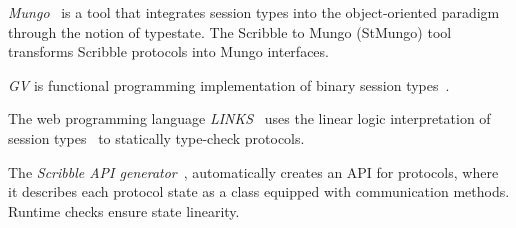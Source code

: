 {\em Mungo}~\cite{mungo} is a tool that integrates session types into the object-oriented
paradigm through the notion of typestate.
The Scribble to Mungo (StMungo) tool transforms Scribble
protocols into Mungo interfaces.


{\em GV} is functional programming implementation of binary session types~\cite{DBLP:journals/jfp/Wadler14}.

The web programming language {\em LINKS}~\cite{citation_needed}
uses the linear logic interpretation of session types~\cite{DBLP:journals/jfp/Wadler14}
to statically type-check protocols.

The {\em Scribble API generator}~\cite{HY2016}, automatically creates an API for protocols,
where it describes each protocol state as a class equipped with
communication methods. Runtime checks ensure state linearity.






